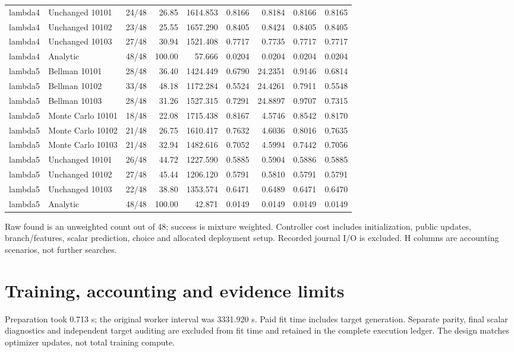 \documentclass[10pt]{article}
\begin{document}
\begin{landscape}
{\begin{tabular}{llrrrrrrr}
lambda4 & Unchanged 10101 & 24/48 & 26.85 & 1614.853 & 0.8166 & 0.8184 & 0.8166 & 0.8165 \\
lambda4 & Unchanged 10102 & 23/48 & 25.55 & 1657.290 & 0.8405 & 0.8424 & 0.8405 & 0.8405 \\
lambda4 & Unchanged 10103 & 27/48 & 30.94 & 1521.408 & 0.7717 & 0.7735 & 0.7717 & 0.7717 \\
lambda4 & Analytic & 48/48 & 100.00 & 57.666 & 0.0204 & 0.0204 & 0.0204 & 0.0204 \\
lambda5 & Bellman 10101 & 28/48 & 36.40 & 1424.449 & 0.6790 & 24.2351 & 0.9146 & 0.6814 \\
lambda5 & Bellman 10102 & 33/48 & 48.18 & 1172.284 & 0.5524 & 24.4261 & 0.7911 & 0.5548 \\
lambda5 & Bellman 10103 & 28/48 & 31.26 & 1527.315 & 0.7291 & 24.8897 & 0.9707 & 0.7315 \\
lambda5 & Monte Carlo 10101 & 18/48 & 22.08 & 1715.438 & 0.8167 & 4.5746 & 0.8542 & 0.8170 \\
lambda5 & Monte Carlo 10102 & 21/48 & 26.75 & 1610.417 & 0.7632 & 4.6036 & 0.8016 & 0.7635 \\
lambda5 & Monte Carlo 10103 & 21/48 & 32.94 & 1482.616 & 0.7052 & 4.5994 & 0.7442 & 0.7056 \\
lambda5 & Unchanged 10101 & 26/48 & 44.72 & 1227.590 & 0.5885 & 0.5904 & 0.5886 & 0.5885 \\
lambda5 & Unchanged 10102 & 27/48 & 45.44 & 1206.120 & 0.5791 & 0.5810 & 0.5791 & 0.5791 \\
lambda5 & Unchanged 10103 & 22/48 & 38.80 & 1353.574 & 0.6471 & 0.6489 & 0.6471 & 0.6470 \\
lambda5 & Analytic & 48/48 & 100.00 & 42.871 & 0.0149 & 0.0149 & 0.0149 & 0.0149 \\
\bottomrule
\end{tabular}
\par}
Raw found is an unweighted count out of 48; success is mixture weighted. Controller cost includes initialization, public updates, branch/features, scalar prediction, choice and allocated deployment setup. Recorded journal I/O is excluded. H columns are accounting scenarios, not further searches.\par
\end{landscape}\section{Training, accounting and evidence limits}
Preparation took 0.713 s; the original worker interval was 3331.920 s. Paid fit time includes target generation. Separate parity, final scalar diagnostics and independent target auditing are excluded from fit time and retained in the complete execution ledger. The design matches optimizer updates, not total training compute.\par
\end{document}
